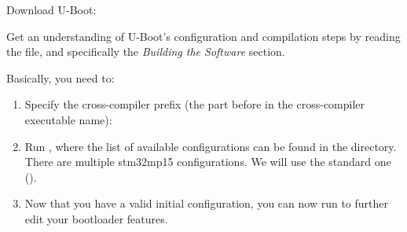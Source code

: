 Download U-Boot:


Get an understanding of U-Boot's configuration and compilation steps
by reading the  file, and specifically the {\em Building
the Software} section.

Basically, you need to:

\begin{enumerate}

\item Specify the cross-compiler prefix
(the part before  in the cross-compiler executable name):

\item Run , where the list of available
  configurations can be found in the  directory. There
  are multiple stm32mp15 configurations. We will use the standard one
  ().

\item Now that you have a valid initial configuration, you can now
  run  to further edit your bootloader features.

  \begin{itemize}


\end{itemize}
\end{enumerate}
